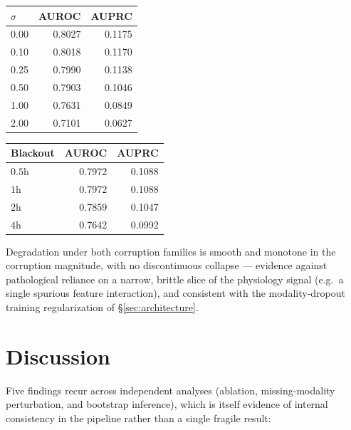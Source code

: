 \documentclass[11pt]{article}
\newcommand{\1}[1]{\mathbf{1}\!\left[#1\right]}
\begin{document}
\begin{table}[h]
\centering
\begin{tabular}{lrr}
\toprule
$\sigma$ & AUROC & AUPRC \\
\midrule
0.00 & 0.8027 & 0.1175 \\
0.10 & 0.8018 & 0.1170 \\
0.25 & 0.7990 & 0.1138 \\
0.50 & 0.7903 & 0.1046 \\
1.00 & 0.7631 & 0.0849 \\
2.00 & 0.7101 & 0.0627 \\
\bottomrule
\end{tabular}
\qquad
\begin{tabular}{lrr}
\toprule
Blackout & AUROC & AUPRC \\
\midrule
$0.5$h & 0.7972 & 0.1088 \\
$1$h & 0.7972 & 0.1088 \\
$2$h & 0.7859 & 0.1047 \\
$4$h & 0.7642 & 0.0992 \\
\bottomrule
\end{tabular}
\end{table}
Degradation under both corruption families is smooth and monotone in the corruption magnitude, with no discontinuous collapse — evidence against pathological reliance on a narrow, brittle slice of the physiology signal (e.g.\ a single spurious feature interaction), and consistent with the modality-dropout training regularization of \S\ref{sec:architecture}.

\section{Discussion}

Five findings recur across independent analyses (ablation, missing-modality perturbation, and bootstrap inference), which is itself evidence of internal consistency in the pipeline rather than a single fragile result:
\end{document}
